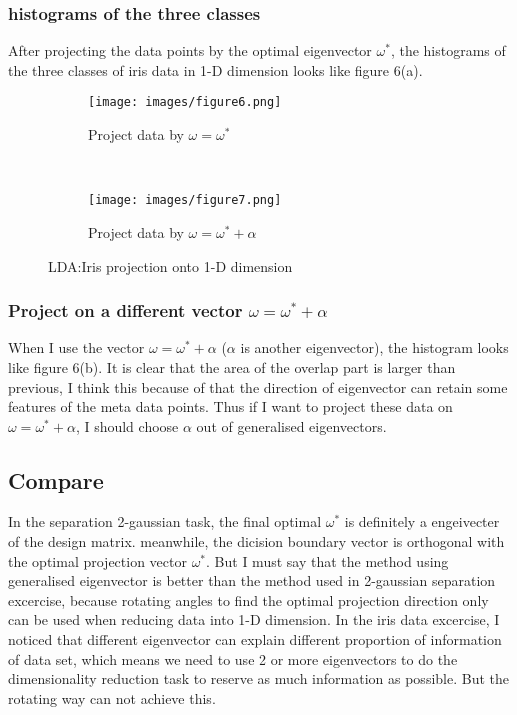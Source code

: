 \documentclass[a4paper, 12pt]{article}
\begin{document}
    \subsubsection{histograms of the three classes}
      After projecting the data points by the optimal eigenvector $\omega^*$, the histograms of the three classes of iris data in 1-D dimension looks like figure 6(a).
      \begin{figure}[h]
        \centering
        \begin{subfigure}[b]{0.45\textwidth}
          \centering
          \texttt{[image: images/figure6.png]}
          \caption{Project data by $\omega = \omega^*$}
        \end{subfigure}%
        ~
        \begin{subfigure}[b]{0.45\textwidth}
          \centering
          \texttt{[image: images/figure7.png]}
          \caption{Project data by $\omega = \omega^* + \alpha$}
        \end{subfigure}
        \caption{LDA:Iris projection onto 1-D dimension}
      \end{figure}
    
    \subsubsection{Project on a different vector $\omega = \omega^* + \alpha$}
      When I use the vector $\omega = \omega^* + \alpha$ ($\alpha$ is another eigenvector), the histogram looks like figure 6(b). It is clear that the area of the overlap part is larger than previous, I think this because of that the direction of eigenvector can retain some features of the meta data points. Thus if I want to project these data on $\omega = \omega^* + \alpha$, I should choose $\alpha$ out of generalised eigenvectors.
      
  \subsection{Compare}
    In the separation 2-gaussian task, the final optimal $\omega^*$ is definitely a engeivecter of the design matrix. meanwhile, the dicision boundary vector is orthogonal with the optimal projection vector $\omega^*$. But I must say that the method using generalised eigenvector is better than the method used in 2-gaussian separation excercise, because rotating angles to find the optimal projection direction only can be used when reducing data into 1-D dimension. In the iris data excercise, I noticed that different eigenvector can explain different proportion of information of data set, which means we need to use 2 or more eigenvectors to do the dimensionality reduction task to reserve as much information as possible. But the rotating way can not achieve this.
    
\end{document}
